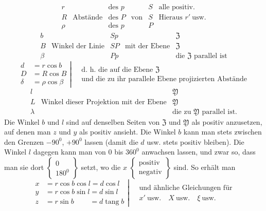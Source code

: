 %
\[
\begin{array}{c|c|c|c|c|l}
r&&\text{des }p&&S&\text{alle positiv.}\\
R&\text{Abstände}&\text{des }P&\text{von}&S&\text{Hieraus }r'\ \text{usw.}\\
\rho&&\text{des }p&&P&
\end{array}
\]
\[
\begin{array}{c|c|c|c|l}
b&&Sp&&\mathfrak{Z}\\
B&\text{Winkel der Linie}&SP&\text{mit der Ebene}&\mathfrak{Z}\\
\beta&&Pp&&\text{die }\mathfrak{Z}\text{ parallel ist}
\end{array}
\]
\[
\left.\begin{aligned}
d&=r\cos b\\D&=R\cos B\\\delta&=\rho\cos\beta
\end{aligned}\right|\quad
\begin{gathered}\text{d.\ h. die auf die Ebene }\mathfrak{Z}\\\text{und die zu ihr parallele Ebene projizierten Abstände}\end{gathered}
\]
\[
\begin{array}{c|c|l}
l&&\mathfrak{Y}\\
L&\text{Winkel dieser Projektion mit der Ebene}&\mathfrak{Y}\\
\lambda&&\text{die zu }\mathfrak{Y}\text{ parallel ist.}
\end{array}
\]
Die Winkel $b$ und $l$ sind auf denselben Seiten von $\mathfrak{Z}$ und $\mathfrak{Y}$ als positiv anzusetzen, auf denen man $z$ und $y$ als positiv ansieht. Die Winkel $b$ kann man stets zwischen den Grenzen $-90^0$, $+90^0$ lassen (damit die $d$ usw. stets positiv bleiben). Die Winkel $l$ dagegen kann man von $0$ bis $360^0$ anwachsen lassen, und zwar so, dass man sie dort $\left\{\begin{smallmatrix}0\\180^0\end{smallmatrix}\right\}$ setzt, wo die $x$ $\left\{\begin{smallmatrix}\text{positiv}\\\text{negativ}\end{smallmatrix}\right\}$ sind. So erhält man
\[
\left.\begin{aligned}
x&=r\cos b\cos l=d\cos l\\
y&=r\cos b\sin l=d\sin l\\
z&=r\sin b\phantom{\cos l}=d\operatorname{tang}b
\end{aligned}\right|\quad
\begin{gathered}\text{und ähnliche Gleichungen für}\\x'\ \text{usw.}\quad X\ \text{usw.}\quad\xi\ \text{usw.}\end{gathered}
\]

